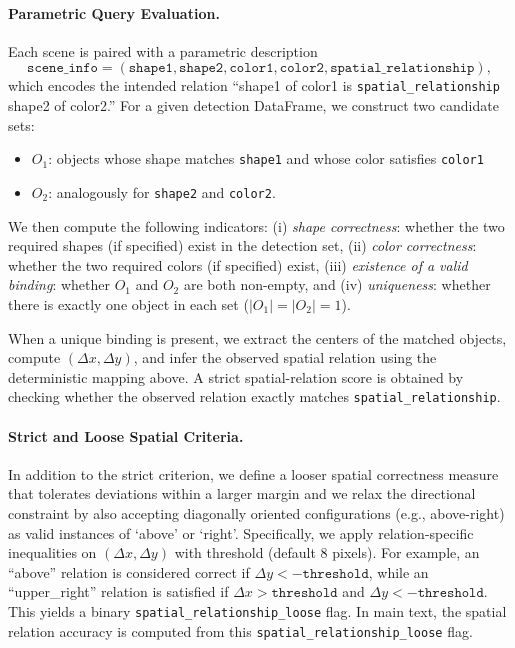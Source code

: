 \paragraph{Parametric Query Evaluation.}
Each scene is paired with a parametric description
\[
\texttt{scene\_info} = (\texttt{shape1}, \texttt{shape2}, \texttt{color1}, \texttt{color2}, \texttt{spatial\_relationship}),
\]
which encodes the intended relation ``shape1 of color1 is \texttt{spatial\_relationship} shape2 of color2.'' For a given detection DataFrame, we construct two candidate sets:
\begin{itemize}
    \item $O_1$: objects whose shape matches \texttt{shape1} and whose color satisfies \texttt{color1}
    \item $O_2$: analogously for \texttt{shape2} and \texttt{color2}.
\end{itemize}
We then compute the following indicators:
(i) \emph{shape correctness}: whether the two required shapes (if specified) exist in the detection set,
(ii) \emph{color correctness}: whether the two required colors (if specified) exist,
(iii) \emph{existence of a valid binding}: whether $O_1$ and $O_2$ are both non-empty, and
(iv) \emph{uniqueness}: whether there is exactly one object in each set ($|O_1| = |O_2| = 1$).

When a unique binding is present, we extract the centers of the matched objects, compute $(\Delta x,\Delta y)$, and infer the observed spatial relation using the deterministic mapping above. A strict spatial-relation score is obtained by checking whether the observed relation exactly matches \texttt{spatial\_relationship}.

\paragraph{Strict and Loose Spatial Criteria.}
In addition to the strict criterion, we define a looser spatial correctness measure that tolerates deviations within a larger margin and we relax the directional constraint by also accepting diagonally oriented configurations (e.g., above-right) as valid instances of ‘above’ or ‘right’. 
Specifically, we apply relation-specific inequalities on $(\Delta x,\Delta y)$ with threshold (default 8 pixels). For example, an ``above'' relation is considered correct if $\Delta y < -\texttt{threshold}$, while an ``upper\_right'' relation is satisfied if $\Delta x > \texttt{threshold}$ and $\Delta y < -\texttt{threshold}$. This yields a binary \texttt{spatial\_relationship\_loose} flag. 
In main text, the spatial relation accuracy is computed from this \texttt{spatial\_relationship\_loose} flag.

